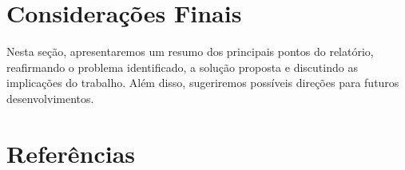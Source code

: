 \documentclass[12pt]{article}
\begin{document}
\section{Considerações Finais}
Nesta seção, apresentaremos um resumo dos principais pontos do relatório, reafirmando o problema identificado, a solução proposta e discutindo as implicações do trabalho. Além disso, sugeriremos possíveis direções para futuros desenvolvimentos. 

\section{Referências}


\end{document}
